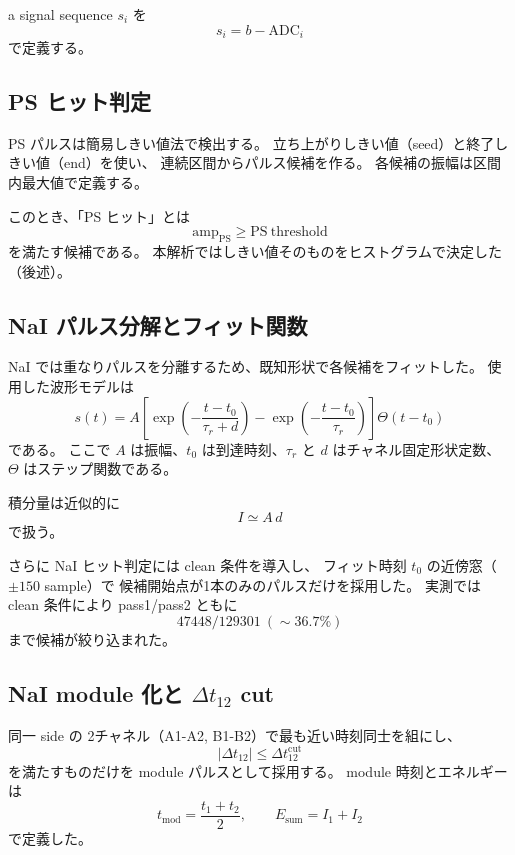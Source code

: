 \documentclass[a4paper,11pt]{jsarticle}
\begin{document}
a signal sequence $s_i$ を
\begin{equation}
 s_i = b - \mathrm{ADC}_i
\end{equation}
で定義する。

\subsection{PS ヒット判定}
PS パルスは簡易しきい値法で検出する。
立ち上がりしきい値（seed）と終了しきい値（end）を使い、
連続区間からパルス候補を作る。
各候補の振幅は区間内最大値で定義する。

このとき、「PS ヒット」とは
\begin{equation}
 \mathrm{amp}_{\mathrm{PS}} \ge \mathrm{PS\ threshold}
\end{equation}
を満たす候補である。
本解析ではしきい値そのものをヒストグラムで決定した（後述）。

\subsection{NaI パルス分解とフィット関数}
NaI では重なりパルスを分離するため、既知形状で各候補をフィットした。
使用した波形モデルは
\begin{equation}
 s(t) = A\left[\exp\left(-\frac{t-t_0}{\tau_r+d}\right)-
 \exp\left(-\frac{t-t_0}{\tau_r}\right)\right]\Theta(t-t_0)
\end{equation}
である。
ここで $A$ は振幅、$t_0$ は到達時刻、$\tau_r$ と $d$ はチャネル固定形状定数、
$\Theta$ はステップ関数である。

積分量は近似的に
\begin{equation}
 I \simeq A\,d
\end{equation}
で扱う。

さらに NaI ヒット判定には clean 条件を導入し、
フィット時刻 $t_0$ の近傍窓（$\pm 150$ sample）で
候補開始点が1本のみのパルスだけを採用した。
実測では clean 条件により
pass1/pass2 ともに
\[
47448 / 129301 \ (\sim 36.7\%)
\]
まで候補が絞り込まれた。

\subsection{NaI module 化と $\Delta t_{12}$ cut}
同一 side の 2チャネル（A1-A2, B1-B2）で最も近い時刻同士を組にし、
\begin{equation}
 |\Delta t_{12}| \le \Delta t_{12}^{\mathrm{cut}}
\end{equation}
を満たすものだけを module パルスとして採用する。
module 時刻とエネルギーは
\begin{equation}
 t_{\mathrm{mod}}=\frac{t_1+t_2}{2},\qquad E_{\mathrm{sum}}=I_1+I_2
\end{equation}
で定義した。
\end{document}
